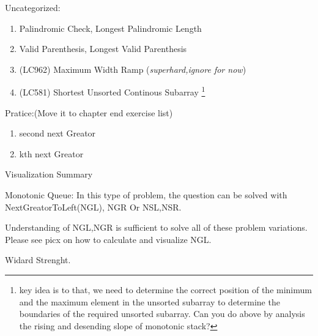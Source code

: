 \begin{exercise}
    Uncategorized:
    \begin{enumerate}
        \item Palindromic Check, Longest Palindromic Length
        \item Valid Parenthesis, Longest Valid Parenthesis
        \item (LC962) Maximum Width Ramp (\textit{superhard,ignore for now})
        
        \item (LC581) Shortest Unsorted Continous Subarray \footnote{key idea is to that, we need to determine the correct position of the minimum and the maximum element in the unsorted subarray to determine the boundaries of the required unsorted subarray.
        Can you do above by analysis the rising and desending slope of monotonic stack?
        }
    \end{enumerate}

    Pratice:(Move it to chapter end exercise list)
    \begin{enumerate}
        \item second next Greator
        \item kth next Greator
    \end{enumerate}
\end{exercise}

\hrulefill Visualization Summary \hrulefill

Monotonic Queue:    
In this type of problem, the question can be solved with NextGreatorToLeft(NGL), NGR Or NSL,NSR.

Understanding of NGL,NGR is sufficient to solve all of these problem variations.
Please see picx on how to calculate and visualize NGL.


Widard Strenght.





